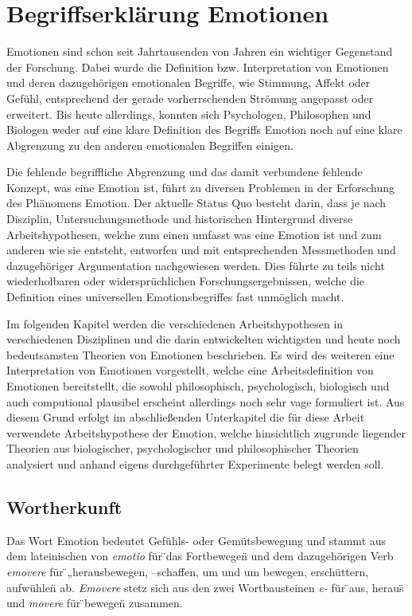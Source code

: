 \chapter{Begriffserklärung Emotionen}

Emotionen sind schon seit Jahrtausenden von Jahren ein wichtiger Gegenstand der Forschung. Dabei wurde die Definition bzw. Interpretation von Emotionen und deren dazugehörigen emotionalen Begriffe, wie Stimmung, Affekt oder Gefühl, entsprechend der gerade vorherrschenden Strömung angepasst oder erweitert. Bis heute allerdings, konnten sich Psychologen, Philosophen und Biologen weder auf eine klare Definition des Begriffs Emotion noch auf eine klare Abgrenzung zu den anderen emotionalen Begriffen einigen.

Die fehlende begriffliche Abgrenzung und das damit verbundene fehlende Konzept, was eine Emotion ist, führt zu diversen Problemen in der Erforschung des Phänomens Emotion. Der aktuelle Status Quo besteht darin, dass je nach Disziplin, Untersuchungsmethode und historischen Hintergrund diverse Arbeitshypothesen, welche zum einen umfasst was eine Emotion ist und zum anderen wie sie entsteht, entworfen und mit entsprechenden Messmethoden und dazugehöriger Argumentation nachgewiesen werden. Dies führte zu teils nicht wiederholbaren oder widersprüchlichen Forschungsergebnissen, welche die Definition eines universellen Emotionsbegriffes fast unmöglich macht.

Im folgenden Kapitel werden die verschiedenen Arbeitshypothesen in verschiedenen Disziplinen und die darin entwickelten wichtigsten und heute noch bedeutsamsten Theorien von Emotionen beschrieben. Es wird des weiteren eine Interpretation von Emotionen vorgestellt, welche eine Arbeitsdefinition von Emotionen bereitstellt, die sowohl philosophisch, psychologisch, biologisch und auch computional plausibel erscheint allerdings noch sehr vage formuliert ist. Aus diesem Grund erfolgt im abschließenden Unterkapitel die für diese Arbeit verwendete Arbeitshypothese der Emotion, welche hinsichtlich zugrunde liegender Theorien aus biologischer, psychologischer und philosophischer Theorien analysiert und anhand eigens durchgeführter Experimente belegt werden soll.  


\section{Wortherkunft}
Das Wort Emotion bedeutet Gefühls- oder Gemütsbewegung und stammt aus dem lateinischen von \textit{emotio} für \"{}das Fortbewegen\"{} und dem dazugehörigen Verb \textit{emovere} für \"{}„herausbewegen, –schaffen, um und um bewegen, erschüttern, aufwühlen\"{} ab. \textit{Emovere} stetz sich aus den zwei Wortbausteinen \textit{e-} für \"{}aus, heraus\"{} und \textit{movere} für \"{}bewegen\"{} zusammen.

